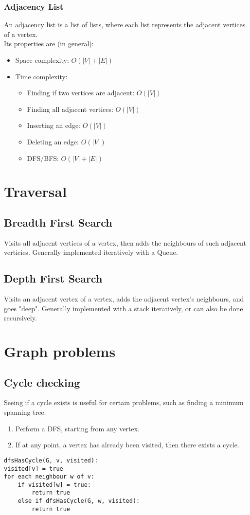 \documentclass[14]{article}
\begin{document}
\subsubsection{Adjacency List}
An adjacency list is a list of lists, where each list represents the adjacent vertices of a vertex. \\ 
Its properties are (in general):
\begin{itemize}
    \item Space complexity: $O(|V| + |E|)$
    \item Time complexity: 
        \begin{itemize}
            \item Finding if two vertices are adjacent: $O(|V|)$
            \item Finding all adjacent vertices: $O(|V|)$
            \item Inserting an edge: $O(|V|)$
            \item Deleting an edge: $O(|V|)$
            \item DFS/BFS: $O(|V| + |E|)$
        \end{itemize}
\end{itemize}
\section{Traversal}
\subsection{Breadth First Search}
Visits all adjacent vertices of a vertex, then adds the neighbours of such adjacent verticies. Generally implemented
iteratively with a Queue.
\subsection{Depth First Search}
Visits an adjacent vertex of a vertex, adds the adjacent vertex's neighbours, and goes "deep". Generally implemented 
with a stack iteratively, or can also be done recursively.
\section{Graph problems}
\subsection{Cycle checking}
Seeing if a cycle exists is useful for certain problems, such as finding a minimum spanning tree.
\begin{enumerate}
    \item Perform a DFS, starting from any vertex.
    \item If at any point, a vertex has already been visited, then there exists a cycle.
\end{enumerate}
\begin{verbatim}
dfsHasCycle(G, v, visited):
visited[v] = true 
for each neighbour w of v:
    if visited[w] = true:
        return true
    else if dfsHasCycle(G, w, visited):
        return true
\end{verbatim}
\pagebreak
\end{document}
